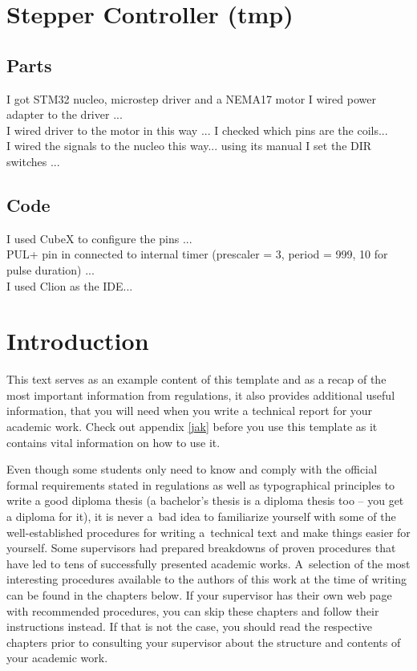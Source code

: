 
% 

\chapter{Stepper Controller (tmp)}
\section{Parts}
I got STM32 nucleo, microstep driver and a NEMA17 motor
I wired power adapter to the driver ...\\
I wired driver to the motor in this way ... I checked which pins are the coils... \\
I wired the signals to the nucleo this way... using its manual
I set the DIR switches ... \\
\section{Code}
I used CubeX to configure the pins ... \\
PUL+ pin in connected to internal timer (prescaler = 3, period = 999, 10 for pulse duration) ... \\
I used Clion as the IDE...\\


\chapter{Introduction}

This text serves as an example content of this template and as a recap of the most important information from regulations, it also provides additional useful information, that you will need when you write a technical report for your academic work. Check out appendix \ref{jak} before you use this template as it contains vital information on how to use it.

Even though some students only need to know and comply with the official formal requirements stated in regulations as well as typographical principles to write a good diploma thesis (a bachelor's thesis is a diploma thesis too -- you get a diploma for it), it is never a~bad idea to familiarize yourself with some of the well-established procedures for writing a~technical text and make things easier for yourself. Some supervisors had prepared breakdowns of proven procedures that have led to tens of successfully presented academic works. A~selection of the most interesting procedures available to the authors of this work at the time of writing can be found in the chapters below. If your supervisor has their own web page with recommended procedures, you can skip these chapters and follow their instructions instead. If that is not the case, you should read the respective chapters prior to consulting your supervisor about the structure and contents of your academic work.

